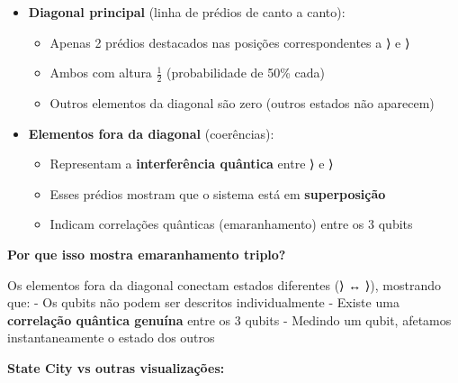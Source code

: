\documentclass[
  brazilian,
]{report}
\providecommand{\tightlist}{%
  \setlength{\itemsep}{0pt}\setlength{\parskip}{0pt}}
\begin{document}
\begin{itemize}
\tightlist
\item
  \textbf{Diagonal principal} (linha de prédios de canto a canto):

  \begin{itemize}
  \tightlist
  \item
    Apenas 2 prédios destacados nas posições correspondentes a
    ⟩ e ⟩
  \item
    Ambos com altura \(\frac{1}{2}\) (probabilidade de 50\% cada)
  \item
    Outros elementos da diagonal são zero (outros estados não aparecem)
  \end{itemize}
\item
  \textbf{Elementos fora da diagonal} (coerências):

  \begin{itemize}
  \tightlist
  \item
    Representam a \textbf{interferência quântica} entre ⟩ e
    ⟩
  \item
    Esses prédios mostram que o sistema está em \textbf{superposição}
  \item
    Indicam correlações quânticas (emaranhamento) entre os 3 qubits
  \end{itemize}
\end{itemize}

\textbf{Por que isso mostra emaranhamento triplo?}

Os elementos fora da diagonal conectam estados diferentes (⟩
↔ ⟩), mostrando que: - Os qubits não podem ser descritos
individualmente - Existe uma \textbf{correlação quântica genuína} entre
os 3 qubits - Medindo um qubit, afetamos instantaneamente o estado dos
outros

\textbf{State City vs outras visualizações:}
\end{document}
